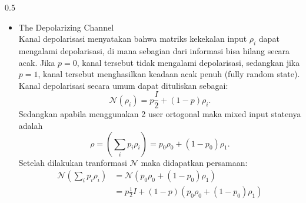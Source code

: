\begin{frame}
\begin{columns}
    \begin{column}{0.5\textwidth}\vspace{-1.8cm} %
            \justifying %
      \small %
        \begin{itemize}
            \item The Depolarizing Channel\\
                {\fontsize{4}{6}\selectfont \justifying
                Kanal depolarisasi menyatakan bahwa matriks kekekalan input $\rho_i$ dapat mengalami depolarisasi, di mana sebagian dari informasi bisa hilang secara acak. Jika $p=0$, kanal tersebut tidak mengalami depolarisasi, sedangkan jika $p=1$, kanal tersebut menghasilkan keadaan acak penuh (fully random state). Kanal depolarisasi secara umum dapat dituliskan sebagai:
                    \begin{equation}
                        \mathcal{N}(\rho_i) = p \frac{I}{2} + (1 - p) \rho_i.
                    \end{equation}
                Sedangkan apabila menggunakan 2 user ortogonal maka mixed input statenya adalah
                    \begin{equation}
                        \rho=\left(\sum_{i}p_i\rho_i\right)=p_0\rho_0+(1-p_0)\rho_1.
                    \end{equation}
                Setelah dilakukan tranformasi $\mathcal{N}$ maka didapatkan persamaan:
                    \begin{equation}
                    \begin{aligned}
                        \mathcal{N}\left(\sum_{i}p_i\rho_i\right) &= \mathcal{N}(p_0\rho_0+(1-p_0)\rho_1) \\
                        &= p\frac{1}{2}I+(1-p)(p_0\rho_0+(1-p_0)\rho_1)
                    \end{aligned}
                    \end{equation}
                }
        \end{itemize}
    \end{column}
  \end{columns}
\end{frame}


